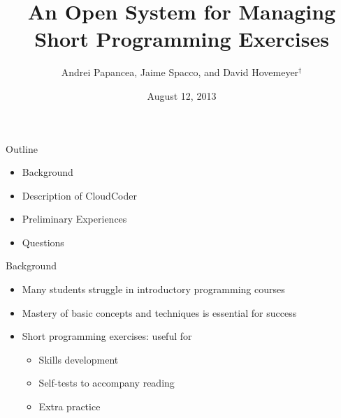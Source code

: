 \documentclass{beamer}
\begin{document}
\title[ICER 2013]{An Open System for Managing Short Programming Exercises}
\author[Papancea et.\ al.]{Andrei Papancea, Jaime Spacco, and David Hovemeyer${}^{\dagger}$}
\date[August, 2013]{August 12, 2013}

\begin{frame}[plain]
  \titlepage
\end{frame}

\begin{frame}{Outline}

\begin{itemize}
  \item Background
  \item Description of CloudCoder
  \item Preliminary Experiences
  \item Questions
\end{itemize}

\end{frame}

\begin{frame}{Background}

\begin{itemize}
  \item Many students struggle in introductory programming courses
  \item Mastery of basic concepts and techniques is essential for success
  \item Short programming exercises: useful for
  \begin{itemize}
    \item Skills development
    \item Self-tests to accompany reading
    \item Extra practice
  \end{itemize}
\end{itemize}

\end{frame}
\end{document}
